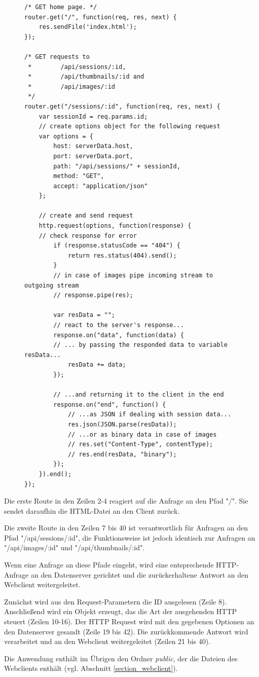 \begin{figure}
\begin{lstlisting}[caption={Auszug aus den Dateien routes/index.js und routes/apiRoutes.js}, label=list_api]
/* GET home page. */
router.get("/", function(req, res, next) {
    res.sendFile('index.html');
});

/* GET requests to 
 *        /api/sessions/:id,
 *        /api/thumbnails/:id and 
 *        /api/images/:id 
 */
router.get("/sessions/:id", function(req, res, next) {
    var sessionId = req.params.id;
    // create options object for the following request
	var options = {
		host: serverData.host,
		port: serverData.port,
		path: "/api/sessions/" + sessionId,
		method: "GET",
		accept: "application/json"
	};

	// create and send request
	http.request(options, function(response) {
	// check response for error
	    if (response.statusCode == "404") {
	        return res.status(404).send();
		}
		// in case of images pipe incoming stream to outgoing stream
		// response.pipe(res);
		
		var resData = "";
		// react to the server's response...
		response.on("data", function(data) {
		// ... by passing the responded data to variable resData...
		    resData += data;
		});
		
		// ...and returning it to the client in the end
		response.on("end", function() {
		    // ...as JSON if dealing with session data...
		    res.json(JSON.parse(resData));
		    // ...or as binary data in case of images
		    // res.set("Content-Type", contentType);
		    // res.end(resData, "binary");
		});
	}).end();
});
\end{lstlisting}
\end{figure}\clearpage

Die erste Route in den Zeilen 2-4 reagiert auf die Anfrage an den Pfad "/".
Sie sendet daraufhin die HTML-Datei an den Client zurück.

Die zweite Route in den Zeilen 7 bis 40 ist verantwortlich für Anfragen an den Pfad 
"/api/sessions/:id", die Funktionsweise ist jedoch identisch zur Anfragen 
an "/api/images/:id"{} und "/api/thumbnails/:id".

Wenn eine Anfrage an diese Pfade eingeht, wird eine entsprechende HTTP-Anfrage 
an den Datenserver gerichtet und die zurückerhaltene Antwort an den Webclient 
weitergeleitet.

Zunächst wird aus den Request-Parametern die ID ausgelesen (Zeile 8). Anschließend 
wird ein Objekt erzeugt, das die Art der ausgehenden HTTP steuert (Zeilen 10-16).
Der HTTP Request wird mit den gegebenen Optionen an den Datenserver gesandt (Zeile 19 bis 42).
Die zurückkommende Antwort wird verarbeitet und an den Webclient weitergeleitet (Zeilen 21 bis 40).

Die Anwendung enthält im Übrigen den Ordner \textit{public}, der die Dateien des Webclients 
enthält (vgl. Abschnitt \ref{section_webclient}).


